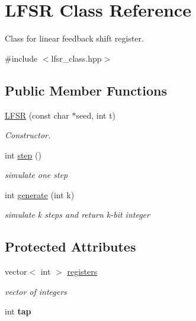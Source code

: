 \hypertarget{class_l_f_s_r}{}\section{L\+F\+SR Class Reference}
\label{class_l_f_s_r}


Class for linear feedback shift register.  




{\ttfamily \#include $<$lfsr\+\_\+class.\+hpp$>$}

\subsection*{Public Member Functions}
\begin{DoxyCompactItemize}
\item 
\hyperlink{class_l_f_s_r_a888d4e80fd747e67c86d91f07f75e1a0}{L\+F\+SR} (const char $\ast$seed, int t)
\begin{DoxyCompactList}\small\item\em Constructor. \end{DoxyCompactList}\item 
int \hyperlink{class_l_f_s_r_a4b4a688ac56dd7a2293d23e2ba2ba693}{step} ()
\begin{DoxyCompactList}\small\item\em simulate one step \end{DoxyCompactList}\item 
int \hyperlink{class_l_f_s_r_a9e0d7ecd1c3f971ba953397cac4fd167}{generate} (int k)
\begin{DoxyCompactList}\small\item\em simulate k steps and return k-\/bit integer \end{DoxyCompactList}\end{DoxyCompactItemize}
\subsection*{Protected Attributes}
\begin{DoxyCompactItemize}
\item 
vector$<$ int $>$ \hyperlink{class_l_f_s_r_a8514dc26ea215d17d6fcb4ae096c36c3}{registers}\hypertarget{class_l_f_s_r_a8514dc26ea215d17d6fcb4ae096c36c3}{}\label{class_l_f_s_r_a8514dc26ea215d17d6fcb4ae096c36c3}

\begin{DoxyCompactList}\small\item\em vector of integers \end{DoxyCompactList}\item 
int {\bfseries tap}\hypertarget{class_l_f_s_r_a399777cd79b60ce9807772e3027badf4}{}\label{class_l_f_s_r_a399777cd79b60ce9807772e3027badf4}

\end{DoxyCompactItemize}
